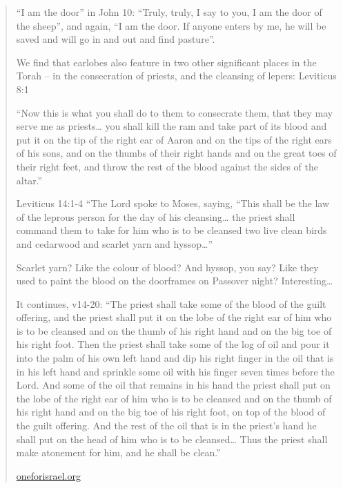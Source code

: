 \documentclass[11pt]{article}
\begin{document}
\begin{quote}
“I am the door” in John 10: “Truly, truly, I say to you, I am the door of the sheep”, and again, “I am the door. If anyone enters by me, he will be saved and will go in and out and find pasture”.

We find that earlobes also feature in two other significant places in the Torah – in the consecration of priests, and the cleansing of lepers: Leviticus 8:1

“Now this is what you shall do to them to consecrate them, that they may serve me as priests… you shall kill the ram and take part of its blood and put it on the tip of the right ear of Aaron and on the tips of the right ears of his sons, and on the thumbs of their right hands and on the great toes of their right feet, and throw the rest of the blood against the sides of the altar.”

Leviticus 14:1-4 “The Lord spoke to Moses, saying, “This shall be the law of the leprous person for the day of his cleansing… the priest shall command them to take for him who is to be cleansed two live clean birds and cedarwood and scarlet yarn and hyssop…”

Scarlet yarn? Like the colour of blood? And hyssop, you say? Like they used to paint the blood on the doorframes on Passover night? Interesting…

It continues, v14-20: “The priest shall take some of the blood of the guilt offering, and the priest shall put it on the lobe of the right ear of him who is to be cleansed and on the thumb of his right hand and on the big toe of his right foot. Then the priest shall take some of the log of oil and pour it into the palm of his own left hand and dip his right finger in the oil that is in his left hand and sprinkle some oil with his finger seven times before the Lord. And some of the oil that remains in his hand the priest shall put on the lobe of the right ear of him who is to be cleansed and on the thumb of his right hand and on the big toe of his right foot, on top of the blood of the guilt offering. And the rest of the oil that is in the priest’s hand he shall put on the head of him who is to be cleansed… Thus the priest shall make atonement for him, and he shall be clean.”

\url{oneforisrael.org}
\end{quote}
\fi
\end{document}
